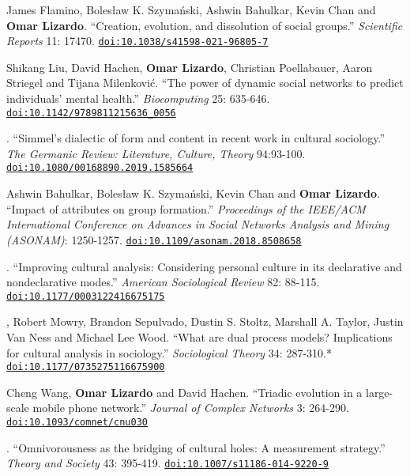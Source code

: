 \documentclass[10pt]{article}
\begin{document}
\ind James Flamino, Boles\l{}aw K. Szyma\'{n}ski, Ashwin Bahulkar, Kevin Chan and {\bf Omar Lizardo}. ``Creation, evolution, and dissolution of social groups.'' {\em Scientific Reports} 11: 17470. \href{https://doi.org/10.1038/s41598-021-96805-7}{\nolinkurl{doi:10.1038/s41598-021-96805-7}} 


\ind Shikang Liu, David Hachen, {\bf Omar Lizardo}, Christian Poellabauer, Aaron Striegel and Tijana Milenkovi\'{c}. ``The power of dynamic social networks to predict individuals' mental health.'' {\em Biocomputing} 25: 635-646. \href{https://doi.org/10.1142/9789811215636_0056}{\nolinkurl{doi:10.1142/9789811215636_0056}}


. ``Simmel's dialectic of form and content in recent work in cultural sociology.'' {\em The Germanic Review: Literature, Culture, Theory} 94:93-100. \href{https://doi.org/10.1080/00168890.2019.1585664}{\nolinkurl{doi:10.1080/00168890.2019.1585664}}


\ind Ashwin Bahulkar, Boles\l{}aw K. Szyma\'{n}ski, Kevin Chan and {\bf Omar Lizardo}. ``Impact of attributes on group formation.'' {\em Proceedings of the IEEE/ACM International Conference on Advances in Social Networks Analysis and Mining (ASONAM)}: 1250-1257. \href{https://doi.org/10.1109/asonam.2018.8508658}{\nolinkurl{doi:10.1109/asonam.2018.8508658}} 


. ``Improving cultural analysis: Considering personal culture in its declarative and nondeclarative modes.'' {\em American Sociological Review} 82: 88-115. \href{https://doi.org/10.1177/0003122416675175}{\nolinkurl{doi:10.1177/0003122416675175}} 


, Robert Mowry, Brandon Sepulvado, Dustin S. Stoltz, Marshall A. Taylor, Justin Van Ness and Michael Lee Wood. ``What are dual process models? Implications for cultural analysis in sociology.'' {\em Sociological Theory} 34: 287-310.\textcolor{uclablue}{*} \href{https://doi.org/10.1177/0735275116675900}{\nolinkurl{doi:10.1177/0735275116675900}}


\ind Cheng Wang, {\bf Omar Lizardo} and David Hachen. ``Triadic evolution in a large-scale mobile phone network.'' {\em Journal of Complex Networks} 3: 264-290. \href{https://doi.org/10.1093/comnet/cnu030}{\nolinkurl{doi:10.1093/comnet/cnu030}}


. ``Omnivorousness as the bridging of cultural holes: A measurement strategy.'' {\em Theory and Society}  43: 395-419. \href{https://doi.org/10.1007/s11186-014-9220-9}{\nolinkurl{doi:10.1007/s11186-014-9220-9}}
\end{document}
